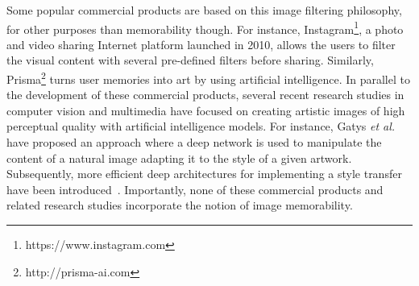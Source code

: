 \documentclass{sig-alternate-05-2015}
\begin{document}
Some popular commercial products are based on this image filtering philosophy, for other purposes than memorability though. For instance, Instagram\footnote{https://www.instagram.com}, a photo and video sharing Internet platform launched in 2010, allows the users to filter the visual content with several pre-defined filters before sharing. %
Similarly, Prisma\footnote{http://prisma-ai.com} %
turns user memories into art by using artificial intelligence. %
In parallel to the development of these commercial products, several recent research studies in computer vision and multimedia have focused on creating artistic images of high perceptual quality with artificial intelligence models. For instance, Gatys \textit{et al.}~\cite{gatys2016image} have proposed an approach where a deep network is used to manipulate the content of a natural image adapting it to the style of a given artwork. Subsequently, more efficient deep architectures for implementing a style transfer have been introduced~\cite{ulyanov2016texture}. Importantly, none of these commercial products and related research studies incorporate the notion of image memorability. 
 
\end{document}
